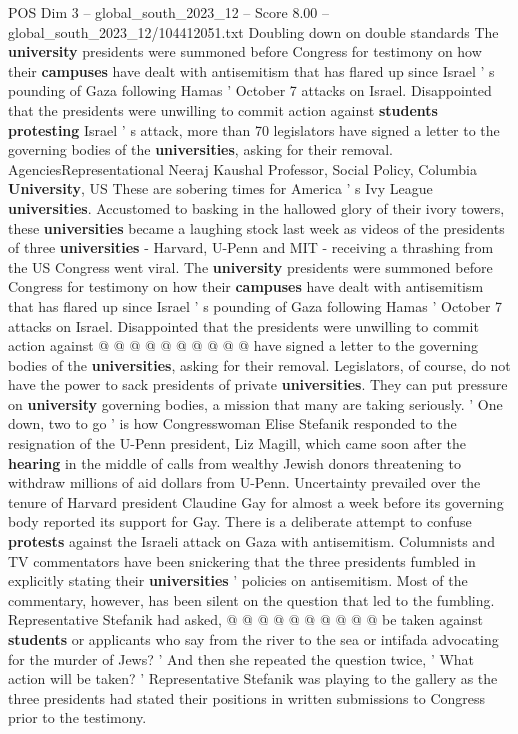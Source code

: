 \begin{textsample}{POS Dim 3 – global\_south\_2023\_12 – Score 8.00 – global\_south\_2023\_12/104412051.txt}  \label{ex:f3_pos_421}
Doubling down on double standards The \textbf{university} presidents were summoned before Congress for testimony on how their \textbf{campuses} have dealt with antisemitism that has flared up since Israel ' s pounding of Gaza following Hamas ' October 7 attacks on Israel.
Disappointed that the presidents were unwilling to commit action against \textbf{students} \textbf{protesting} Israel ' s attack, more than 70 legislators have signed a letter to the governing bodies of the \textbf{universities}, asking for their removal.
AgenciesRepresentational Neeraj Kaushal Professor, Social Policy, Columbia \textbf{University}, US These are sobering times for America ' s Ivy League \textbf{universities}.
Accustomed to basking in the hallowed glory of their ivory towers, these \textbf{universities} became a laughing stock last week as videos of the presidents of three \textbf{universities} - Harvard, U-Penn and MIT - receiving a thrashing from the US Congress went viral.
The \textbf{university} presidents were summoned before Congress for testimony on how their \textbf{campuses} have dealt with antisemitism that has flared up since Israel ' s pounding of Gaza following Hamas ' October 7 attacks on Israel.
Disappointed that the presidents were unwilling to commit action against @ @ @ @ @ @ @ @ @ @ have signed a letter to the governing bodies of the \textbf{universities}, asking for their removal.
Legislators, of course, do not have the power to sack presidents of private \textbf{universities}.
They can put pressure on \textbf{university} governing bodies, a mission that many are taking seriously. ' One down, two to go ' is how Congresswoman Elise Stefanik responded to the resignation of the U-Penn president, Liz Magill, which came soon after the \textbf{hearing} in the middle of calls from wealthy Jewish donors threatening to withdraw millions of aid dollars from U-Penn.
Uncertainty prevailed over the tenure of Harvard president Claudine Gay for almost a week before its governing body reported its support for Gay.
There is a deliberate attempt to confuse \textbf{protests} against the Israeli attack on Gaza with antisemitism.
Columnists and TV commentators have been snickering that the three presidents fumbled in explicitly stating their \textbf{universities} ' policies on antisemitism.
Most of the commentary, however, has been silent on the question that led to the fumbling.
Representative Stefanik had asked, @ @ @ @ @ @ @ @ @ @ be taken against \textbf{students} or applicants who say from the river to the sea or intifada advocating for the murder of Jews? ' And then she repeated the question twice, ' What action will be taken? ' Representative Stefanik was playing to the gallery as the three presidents had stated their positions in written submissions to Congress prior to the testimony.

\end{textsample}
